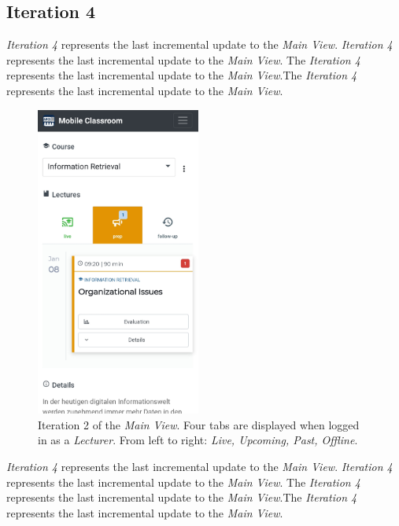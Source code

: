 \subsection{Iteration 4}
\emph{Iteration 4} represents the last incremental update to the \emph{Main View}.
\emph{Iteration 4} represents the last incremental update to the \emph{Main View}.
The \emph{Iteration 4} represents the last incremental update to the \emph{Main View}.The \emph{Iteration 4} represents the last incremental update to the \emph{Main View}.
\begin{figure}
	\vspace*{-0.5cm}
	\begin{center}
		\includegraphics[width=0.48\textwidth]{screenshots/redesign/main_view_iteration_4.jpg}
	\end{center}
	\caption{Iteration 2 of the \emph{Main View}. Four tabs are displayed when logged in as a \emph{Lecturer}. From left to right: \emph{Live, Upcoming, Past, Offline}.}
	\label{fig:main_view_course_actions_bad}
\end{figure}
\emph{Iteration 4} represents the last incremental update to the \emph{Main View}.
\emph{Iteration 4} represents the last incremental update to the \emph{Main View}.
The \emph{Iteration 4} represents the last incremental update to the \emph{Main View}.The \emph{Iteration 4} represents the last incremental update to the \emph{Main View}.


